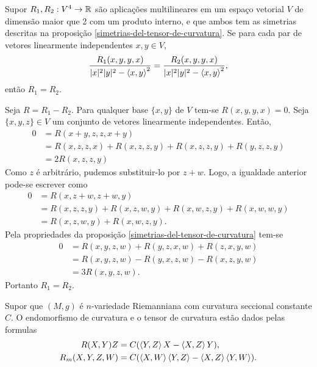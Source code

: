 \begin{lema}\label{igualdade-de-4-tensores-covariantes}
	Supor $R_1,R_2: V^4 \rightarrow \mathbb R$ são aplicações multilineares em um espaço vetorial $V$ de dimensão maior que 2 com um produto interno, e que ambos tem as simetrias descritas na proposição \ref{simetrias-del-tensor-de-curvatura}. Se para cada par de vetores linearmente independentes $x,y \in V$,
	\begin{equation*}
	\frac{R_1(x,y,y,x)}{|x|^2 |y|^2 - \left\langle x,y \right\rangle^2} = \frac{R_2(x,y,y,x)}{|x|^2 |y|^2 - \left\langle x,y \right\rangle^2},
	\end{equation*}
	então $R_1 = R_2$.
\end{lema}

\begin{demonstracao}
	Seja $R = R_1 - R_2$.
	Para qualquer base $\{x,y\}$ de $V$ tem-se $R(x,y,y,x)=0$.
	Seja $\{x,y,z\} \in V$ um conjunto de vetores linearmente independentes. Então,
	\begin{align*}
	0 &= R(x+y,z,z,x+y)\\
	&= R(x,z,z,x) + R(x,z,z,y) + R(x,z,z,y) + R(y,z,z,y)\\
	&= 2R(x,z,z,y)
	\end{align*}
	Como $z$ é arbitrário, pudemos substituir-lo por $z+w$. Logo, a igualdade anterior pode-se escrever como
	\begin{align*}
	0 &= R(x,z+w,z+w,y)\\
	&= R(x,z,z,y) + R(x,z,w,y) + R(x,w,z,y) + R(x,w,w,y)\\
	&= R(x,z,w,y) + R(x,w,z,y).
	\end{align*}
	Pela propriedades da proposição \ref{simetrias-del-tensor-de-curvatura} tem-se
	\begin{align*}
	0 &= R(x,y,z,w) + R(y,z,x,w) + R(z,x,y,w)\\
	&= R(x,y,z,w) - R(y,x,z,w) - R(x,z,y,w)\\
	&= 3R(x,y,z,w).
	\end{align*}
	Portanto $R_1 = R_2$.
\end{demonstracao}

\begin{proposicao}
	Supor que $(M,g)$ é $n$-variedade Riemanniana com curvatura seccional constante $C$. O endomorfismo de curvatura e o tensor de curvatura estão dados pelas formulas
	\begin{align*}
	R(X,Y)Z &= C(\left\langle Y,Z \right\rangle X - \left\langle X,Z \right\rangle Y),\\
	R_m(X,Y,Z,W) &= C(\left\langle X,W \right\rangle \left\langle Y,Z \right\rangle - \left\langle X,Z \right\rangle \left\langle Y,W \right\rangle).
	\end{align*}
\end{proposicao}

